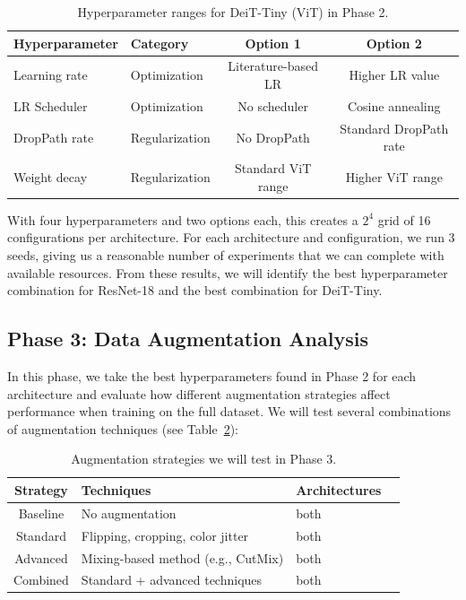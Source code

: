 \documentclass[12pt,a4paper]{article}
\begin{document}
\begin{table}[H]
\centering
\caption{Hyperparameter ranges for DeiT-Tiny (ViT) in Phase 2.}
\label{tab:hp_deit}
\begin{tabular}{@{}llcc@{}}
\toprule
\textbf{Hyperparameter} & \textbf{Category} & \textbf{Option 1} & \textbf{Option 2} \\
\midrule
Learning rate & Optimization & Literature-based LR & Higher LR value \\
LR Scheduler & Optimization & No scheduler & Cosine annealing \\
DropPath rate & Regularization & No DropPath & Standard DropPath rate \\
Weight decay & Regularization & Standard ViT range & Higher ViT range \\
\bottomrule
\end{tabular}
\end{table}

With four hyperparameters and two options each, this creates a $2^4$ grid of 16 configurations per architecture. For each architecture and configuration, we run 3 seeds, giving us a reasonable number of experiments that we can complete with available resources. From these results, we will identify the best hyperparameter combination for ResNet-18 and the best combination for DeiT-Tiny.

\subsection{Phase 3: Data Augmentation Analysis}

In this phase, we take the best hyperparameters found in Phase 2 for each architecture and evaluate how different augmentation strategies affect performance when training on the full dataset. We will test several combinations of augmentation techniques (see Table~\ref{tab:aug_strategies}):

\begin{table}[H]
\centering
\caption{Augmentation strategies we will test in Phase 3.}
\label{tab:aug_strategies}
\begin{tabular}{@{}clll@{}}
\toprule
\textbf{Strategy} & \textbf{Techniques} & \textbf{Architectures} \\
\midrule
Baseline & No augmentation & both \\
Standard & Flipping, cropping, color jitter & both \\
Advanced & Mixing-based method (e.g., CutMix) & both \\
Combined & Standard + advanced techniques & both\\
\bottomrule
\end{tabular}
\end{table}
\end{document}
